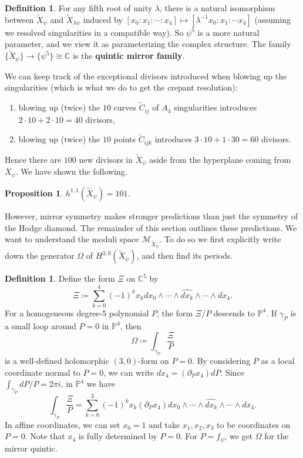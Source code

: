\documentclass{report}
\theoremstyle{plain}
\newtheorem{proposition}[theorem]{Proposition}
\theoremstyle{definition}
\newtheorem{definition}[theorem]{Definition}
\theoremstyle{remark}
\newcommand{\di}{\partial}
\newcommand{\bC}{\mathbb{C}}
\newcommand{\bP}{\mathbb{P}}
\newcommand{\cM}{\mathcal{M}}
\begin{document}
\begin{definition}
  For any fifth root of unity $\lambda$, there is a natural
  isomorphism between $\tilde{X}_{\psi}$ and $\tilde{X}_{\lambda\psi}$
  induced by $[x_0 : x_1 : \cdots : x_4] \mapsto [\lambda^{-1}x_0 :
    x_1 : \cdots x_4]$ (assuming we resolved singularities in a
  compatible way). So $\psi^5$ is a more natural parameter, and we
  view it as parameterizing the complex structure. The family
  $\{\tilde{X}_{\psi}\} \to \{\psi^5\} \cong \bC$ is the {\bf quintic
    mirror family}.
\end{definition}

We can keep track of the exceptional divisors introduced when blowing
up the singularities (which is what we do to get the crepant
resolution):
\begin{enumerate}
\item blowing up (twice) the $10$ curves $\tilde{C}_{ij}$ of $A_4$
  singularities introduces $2 \cdot 10 + 2 \cdot 10 = 40$ divisors,
\item blowing up (twice) the $10$ points $\tilde{C}_{ijk}$ introduces
  $3 \cdot 10 + 1 \cdot 30 = 60$ divisors.
\end{enumerate}
Hence there are $100$ new divisors in $\tilde{X}_\psi$ aside from the
hyperplane coming from $X_\psi$. We have shown the following.

\begin{proposition}
  $h^{1,1}(\tilde{X}_\psi) = 101$.
\end{proposition}

However, mirror symmetry makes stronger predictions than just the
symmetry of the Hodge diamond. The remainder of this section outlines
these predictions. We want to understand the moduli space
$\cM_{\tilde{X}_{\psi}}$. To do so we first explicitly write down the
generator $\Omega$ of $H^{3,0}(\tilde{X}_\psi)$, and then find its
periods.

\begin{definition}
  Define the form $\Xi$ on $\bC^5$ by
  \[ \Xi \coloneqq \sum_{k=0}^4 (-1)^k x_k dx_0 \wedge \cdots \wedge \widehat{dx_k} \wedge \cdots \wedge dx_4. \]
  For a homogeneous degree-$5$ polynomial $P$, the form $\Xi/P$
  descends to $\bP^4$. If $\gamma_P$ is a small loop around $P=0$ in
  $\bP^4$, then
  \[ \Omega \coloneqq \int_{\gamma_P} \frac{\Xi}{P} \]
  is a well-defined holomorphic $(3,0)$-form on $P=0$. By considering
  $P$ as a local coordinate normal to $P=0$, we can write $dx_4 =
  (\di_P x_4) dP$. Since $\int_{\gamma_P} dP/P = 2\pi i$, in $\bP^4$
  we have
  \[ \int_{\gamma_P} \frac{\Xi}{P} = \sum_{k=0}^3 (-1)^k x_k (\di_P x_4) dx_0 \wedge \cdots \wedge \widehat{dx_k} \wedge \cdots \wedge dx_4. \]
  In affine coordinates, we can set $x_0 = 1$ and take $x_1, x_2, x_3$
  to be coordinates on $P = 0$. Note that $x_4$ is fully determined by
  $P=0$. For $P = f_\psi$, we get $\Omega$ for the mirror quintic.
\end{definition}
\end{document}

